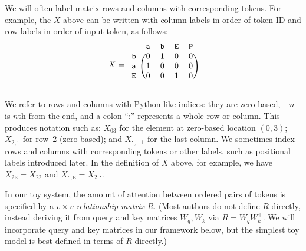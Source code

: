 \documentclass{article}
\newcommand{\ta}{\mathtt{a}}
\newcommand{\tb}{\mathtt{b}}
\newcommand{\tE}{\mathtt{E}}
\newcommand{\tP}{\mathtt{P}}
\newcommand{\Tr}{^{\top}} %
\newcommand{\by}{\times}
\begin{document}
We will often label matrix rows and columns with corresponding
tokens. For example, the $X$ above can be written with column labels
in order of token ID and row labels in order of input token, as
follows:
\begin{displaymath}
  X = 
    \begin{blockarray}{ccccc}
       & \ta & \tb & \tE & \tP  \\
      \begin{block}{c(cccc)}
        \tb & 0 & 1 & 0 & 0 \\
        \ta & 1 & 0 & 0 & 0 \\
        \tE & 0 & 0 & 1 & 0 \\
      \end{block}
    \end{blockarray}
\end{displaymath}

We refer to rows and columns with Python-like indices: they are zero-based, $-n$ is $n$th from the end, and a colon ``:'' represents a whole row or column. This produces notation such as: 
$X_{03}$ for the element at zero-based location $(0,3)$; $X_{2,:}$ for row~2 (zero-based); and $X_{:,-1}$ for the last column. We sometimes index rows and columns with corresponding tokens or other labels, such as positional labels introduced later. In the definition of $X$ above, for example, we have  $X_{2 \tE}=X_{2 2}$ and $X_{:,\tE}=X_{2,:}$.


In our toy system, the amount of attention between ordered pairs of
tokens is specified by a $v \by v$ \emph{relationship matrix}
$R$. (Most authors do not define $R$ directly, instead deriving it
from query and key matrices $W_q, W_k$ via $R=W_q W_k\Tr$. We will incorporate query and
key matrices in our framework below, but the simplest toy model is
best defined in terms of $R$ directly.)
\end{document}
